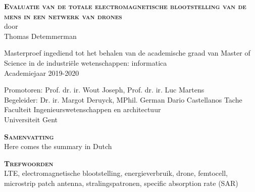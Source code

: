 \begin{center}
\textsc{\textbf{\Huge Evaluatie van de totale electromagnetische blootstelling van de mens in een netwerk van drones}}\\

door\\
Thomas Detemmerman

Masterproef ingediend tot het behalen van de academische graad van Master of Science in de
industri\"ele wetenschappen: informatica\\
Academiejaar 2019-2020

Promotoren: Prof. dr. ir. Wout Joseph, Prof. dr. ir. Luc Martens\\
Begeleider: Dr. ir. Margot Deruyck, MPhil. German Dario Castellanos Tache\\
Faculteit Ingenieurswetenschappen en architectuur\\
Universiteit Gent
\end{center}

\textsc{\textbf{\LARGE Samenvatting}}\\

Here comes the summary in Dutch

\textsc{\textbf{\LARGE Trefwoorden}}\\

LTE, electromagnetische blootstelling, energieverbruik, drone, femtocell, microstrip patch antenna, stralingspatronen, specific absorption rate (SAR)

